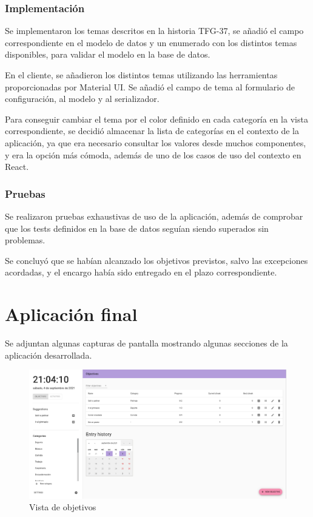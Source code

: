 \documentclass[10pt, a4paper]{aqademic}
\begin{document}
\subsubsection{Implementación}

Se implementaron los temas descritos en la historia TFG-37, se añadió el campo correspondiente en el modelo de datos y un enumerado con los distintos temas disponibles, para validar el modelo en la base de datos.

En el cliente, se añadieron los distintos temas utilizando las herramientas proporcionadas por Material UI. Se añadió el campo de tema al formulario de configuración, al modelo y al serializador. 

Para conseguir cambiar el tema por el color definido en cada categoría en la vista correspondiente, se decidió almacenar la lista de categorías en el contexto de la aplicación, ya que era necesario consultar los valores desde muchos componentes, y era la opción más cómoda, además de uno de los casos de uso del contexto en React.


\subsubsection{Pruebas}

Se realizaron pruebas exhaustivas de uso de la aplicación, además de comprobar que los tests definidos en la base de datos seguían siendo superados sin problemas.

Se concluyó que se habían alcanzado los objetivos previstos, salvo las excepciones acordadas, y el encargo había sido entregado en el plazo correspondiente.


\section{Aplicación final}

Se adjuntan algunas capturas de pantalla mostrando algunas secciones de la aplicación desarrollada.

\begin{figure}[hbt!]
	\centering
	\includegraphics[scale=0.25]{img/demo-obj-1.png}
	\caption{Vista de objetivos}
\end{figure}
\end{document}
